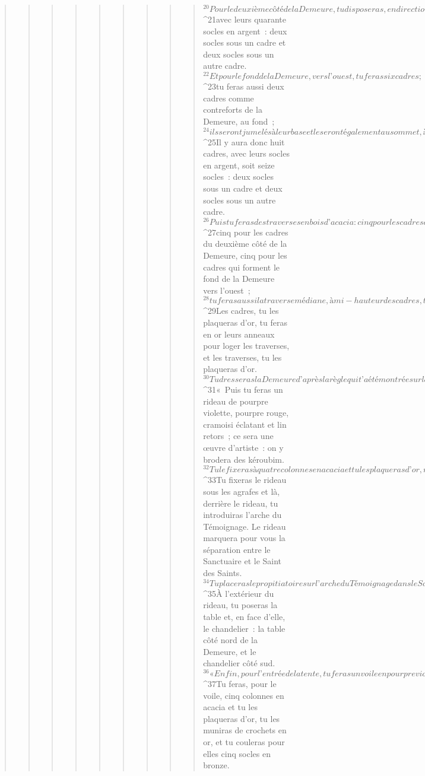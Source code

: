 \begin{verse}
\begin{verse}
\begin{verse}
\begin{verse}
\begin{verse}
\begin{verse}
\begin{verse}
\begin{verse}
\begin{verse}
${}^{20}Pour le deuxième côté de la Demeure, tu disposeras, en direction du nord, vingt cadres 
${}^{21}avec leurs quarante socles en argent : deux socles sous un cadre et deux socles sous un autre cadre. 
${}^{22}Et pour le fond de la Demeure, vers l’ouest, tu feras six cadres ; 
${}^{23}tu feras aussi deux cadres comme contreforts de la Demeure, au fond ; 
${}^{24}ils seront jumelés à leur base et le seront également au sommet, à la hauteur du premier anneau : ainsi en sera-t-il pour eux deux, ils seront comme deux contreforts. 
${}^{25}Il y aura donc huit cadres, avec leurs socles en argent, soit seize socles : deux socles sous un cadre et deux socles sous un autre cadre.
${}^{26}Puis tu feras des traverses en bois d’acacia : cinq pour les cadres du premier côté de la Demeure, 
${}^{27}cinq pour les cadres du deuxième côté de la Demeure, cinq pour les cadres qui forment le fond de la Demeure vers l’ouest ; 
${}^{28}tu feras aussi la traverse médiane, à mi-hauteur des cadres, traversant la Demeure d’un bout à l’autre. 
${}^{29}Les cadres, tu les plaqueras d’or, tu feras en or leurs anneaux pour loger les traverses, et les traverses, tu les plaqueras d’or. 
${}^{30}Tu dresseras la Demeure d’après la règle qui t’a été montrée sur la montagne.
${}^{31}« Puis tu feras un rideau de pourpre violette, pourpre rouge, cramoisi éclatant et lin retors ; ce sera une œuvre d’artiste : on y brodera des kéroubim. 
${}^{32}Tu le fixeras à quatre colonnes en acacia et tu les plaqueras d’or, munies de crochets en or et posées sur quatre socles en argent. 
${}^{33}Tu fixeras le rideau sous les agrafes et là, derrière le rideau, tu introduiras l’arche du Témoignage. Le rideau marquera pour vous la séparation entre le Sanctuaire et le Saint des Saints. 
${}^{34}Tu placeras le propitiatoire sur l’arche du Témoignage dans le Saint des Saints. 
${}^{35}À l’extérieur du rideau, tu poseras la table et, en face d’elle, le chandelier : la table côté nord de la Demeure, et le chandelier côté sud.
${}^{36}« Enfin, pour l’entrée de la tente, tu feras un voile en pourpre violette, pourpre rouge, cramoisi éclatant et lin retors : ce sera une œuvre d’artisan brocheur. 
${}^{37}Tu feras, pour le voile, cinq colonnes en acacia et tu les plaqueras d’or, tu les muniras de crochets en or, et tu couleras pour elles cinq socles en bronze.
      

\end{verse}
\end{verse}
\end{verse}
\end{verse}
\end{verse}
\end{verse}
\end{verse}
\end{verse}
\end{verse}
